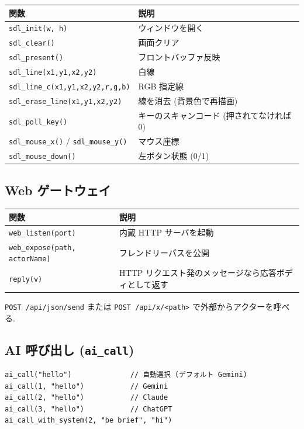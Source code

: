 \documentclass[11pt,a4paper]{article}
\begin{document}
\begin{center}
\begin{tabular}{ll}
\toprule
関数 & 説明 \\
\midrule
\texttt{sdl\_init(w, h)} & ウィンドウを開く \\
\texttt{sdl\_clear()} & 画面クリア \\
\texttt{sdl\_present()} & フロントバッファ反映 \\
\texttt{sdl\_line(x1,y1,x2,y2)} & 白線 \\
\texttt{sdl\_line\_c(x1,y1,x2,y2,r,g,b)} & RGB 指定線 \\
\texttt{sdl\_erase\_line(x1,y1,x2,y2)} & 線を消去 (背景色で再描画) \\
\texttt{sdl\_poll\_key()} & キーのスキャンコード (押されてなければ 0) \\
\texttt{sdl\_mouse\_x()} / \texttt{sdl\_mouse\_y()} & マウス座標 \\
\texttt{sdl\_mouse\_down()} & 左ボタン状態 (0/1) \\
\bottomrule
\end{tabular}
\end{center}

\subsection{Web ゲートウェイ}

\begin{center}
\begin{tabular}{ll}
\toprule
関数 & 説明 \\
\midrule
\texttt{web\_listen(port)} & 内蔵 HTTP サーバを起動 \\
\texttt{web\_expose(path, actorName)} & フレンドリーパスを公開 \\
\texttt{reply(v)} & HTTP リクエスト発のメッセージなら応答ボディとして返す \\
\bottomrule
\end{tabular}
\end{center}

\texttt{POST /api/json/send} または \texttt{POST /api/x/<path>} で外部からアクターを呼べる.

\subsection{AI 呼び出し (\texttt{ai\_call})}

\begin{lstlisting}
ai_call("hello")              // 自動選択 (デフォルト Gemini)
ai_call(1, "hello")           // Gemini
ai_call(2, "hello")           // Claude
ai_call(3, "hello")           // ChatGPT
ai_call_with_system(2, "be brief", "hi")
\end{lstlisting}
\end{document}
